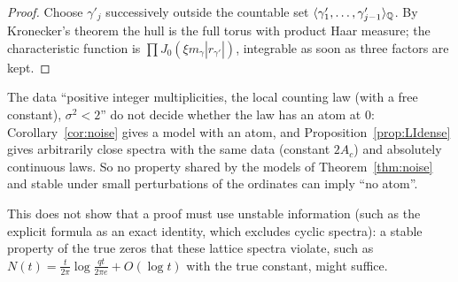 \begin{proof}
Choose $\gamma'_j$ successively outside the countable set $\langle\gamma'_1,\dots,\gamma'_{j-1}\rangle_{\mathbb Q}$. By Kronecker's theorem the hull is the full torus with product Haar measure; the characteristic function is $\prod J_0(\xi m_\gamma|r_{\gamma'}|)$, integrable as soon as three factors are kept.
\end{proof}

\begin{corollary}\label{cor:barrier}
The data ``positive integer multiplicities, the local counting law (with a free constant), $\sigma^2<2$'' do not decide whether the law has an atom at $0$: Corollary~\ref{cor:noise} gives a model with an atom, and Proposition~\ref{prop:LIdense} gives arbitrarily close spectra with the same data (constant $2A_c$) and absolutely continuous laws. So no property shared by the models of Theorem~\ref{thm:noise} and stable under small perturbations of the ordinates can imply ``no atom''.
\end{corollary}

This does not show that a proof must use unstable information (such as the explicit formula as an exact identity, which excludes cyclic spectra): a stable property of the true zeros that these lattice spectra violate, such as $N(t)=\frac t{2\pi}\log\frac{qt}{2\pi e}+O(\log t)$ with the true constant, might suffice.
